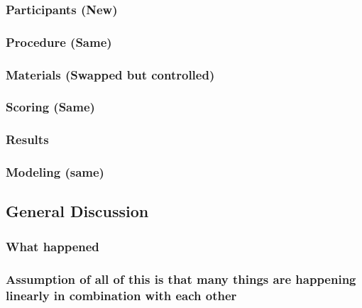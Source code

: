 \documentclass[]{book}
\theoremstyle{definition}
\theoremstyle{definition}
\theoremstyle{definition}
\theoremstyle{remark}
\begin{document}
\hypertarget{participants-new}{%
\subsubsection{Participants (New)}\label{participants-new}}

\hypertarget{procedure-same}{%
\subsubsection{Procedure (Same)}\label{procedure-same}}

\hypertarget{materials-swapped-but-controlled}{%
\subsubsection{Materials (Swapped but
controlled)}\label{materials-swapped-but-controlled}}

\hypertarget{scoring-same}{%
\subsubsection{Scoring (Same)}\label{scoring-same}}

\hypertarget{results-2}{%
\subsubsection{Results}\label{results-2}}

\hypertarget{modeling-same}{%
\subsubsection{Modeling (same)}\label{modeling-same}}

\hypertarget{general-discussion}{%
\subsection{General Discussion}\label{general-discussion}}

\hypertarget{what-happened}{%
\subsubsection{What happened}\label{what-happened}}

\hypertarget{assumption-of-all-of-this-is-that-many-things-are-happening-linearly-in-combination-with-each-other}{%
\subsubsection{Assumption of all of this is that many things are
happening linearly in combination with each
other}\label{assumption-of-all-of-this-is-that-many-things-are-happening-linearly-in-combination-with-each-other}}
\end{document}
